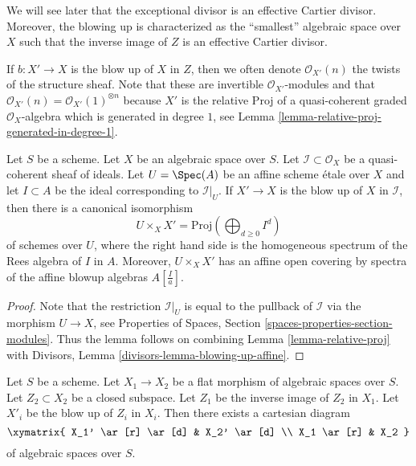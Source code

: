 \noindent
We will see later that the exceptional divisor is an effective Cartier
divisor. Moreover, the blowing up is characterized as the ``smallest''
algebraic space over $X$ such that the inverse image of $Z$ is an
effective Cartier divisor.

\medskip\noindent
If $b : X' \to X$ is the blow up of $X$ in $Z$, then we often denote
$\mathcal{O}_{X'}(n)$ the twists of the structure sheaf. Note that these
are invertible $\mathcal{O}_{X'}$-modules and that
$\mathcal{O}_{X'}(n) = \mathcal{O}_{X'}(1)^{\otimes n}$
because $X'$ is the relative Proj of a quasi-coherent graded
$\mathcal{O}_X$-algebra which is generated in degree $1$, see
Lemma \ref{lemma-relative-proj-generated-in-degree-1}.

\begin{lemma}
\label{lemma-blowing-up-affine}
Let $S$ be a scheme. Let $X$ be an algebraic space over $S$.
Let $\mathcal{I} \subset \mathcal{O}_X$ be a
quasi-coherent sheaf of ideals. Let $U = \Spec(A)$ be an affine scheme
\'etale over $X$ and let $I \subset A$ be the ideal corresponding to
$\mathcal{I}|_U$. If $X' \to X$ is the blow up of $X$ in $\mathcal{I}$,
then there is a canonical isomorphism
$$
U \times_X X' = \text{Proj}(\bigoplus\nolimits_{d \geq 0} I^d)
$$
of schemes over $U$, where the right hand side is
the homogeneous spectrum of the Rees algebra of $I$ in $A$.
Moreover, $U \times_X X'$ has an affine open covering by
spectra of the affine blowup algebras $A[\frac{I}{a}]$.
\end{lemma}

\begin{proof}
Note that the restriction $\mathcal{I}|_U$ is equal to the pullback
of $\mathcal{I}$ via the morphism $U \to X$, see
Properties of Spaces, Section \ref{spaces-properties-section-modules}.
Thus the lemma follows on combining Lemma \ref{lemma-relative-proj} with
Divisors, Lemma \ref{divisors-lemma-blowing-up-affine}.
\end{proof}

\begin{lemma}
\label{lemma-flat-base-change-blowing-up}
Let $S$ be a scheme.
Let $X_1 \to X_2$ be a flat morphism of algebraic spaces over $S$.
Let $Z_2 \subset X_2$ be a closed subspace.
Let $Z_1$ be the inverse image of $Z_2$ in $X_1$.
Let $X'_i$ be the blow up of $Z_i$ in $X_i$. Then there exists a cartesian
diagram
$$
\xymatrix{
X_1' \ar[r] \ar[d] & X_2' \ar[d] \\
X_1 \ar[r] & X_2
}
$$
of algebraic spaces over $S$.
\end{lemma}

